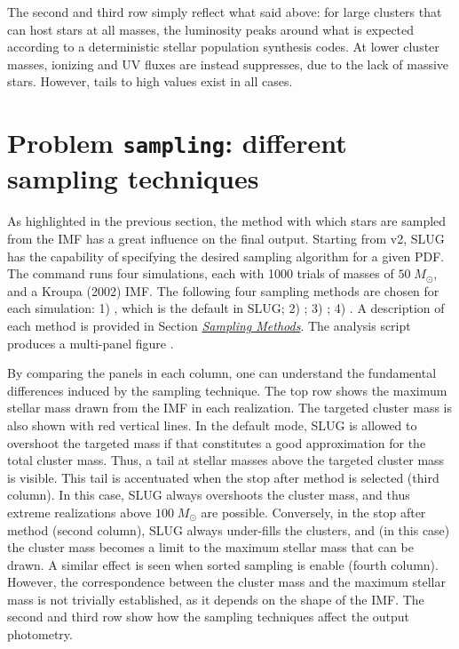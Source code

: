 \documentclass[letterpaper,10pt,english]{sphinxmanual}
\begin{document}
The second and third row simply reflect what said above: for large clusters that can host
stars at all masses, the luminosity peaks around what is expected according to a deterministic
stellar population synthesis codes. At lower cluster masses, ionizing and UV fluxes
are instead suppresses, due to the lack of massive stars. However, tails to high values exist
in all cases.


\section{Problem \texttt{sampling}: different sampling techniques}
\label{tests:problem-sampling-different-sampling-techniques}
As highlighted in the previous section, the method with which stars are sampled from the
IMF has a great influence on the final output. Starting from v2, SLUG has the capability of
specifying the desired sampling algorithm for a given PDF.
The command   runs four  simulations, each with 1000 trials
of masses of \(50\;M_\odot\), and a Kroupa (2002) IMF.
The following four sampling methods are chosen for each simulation: 1) ,
which is the default in SLUG; 2) ; 3) ; 4) .
A description of each method is provided in Section {\hyperref[pdfs:sampling-metod-label]{\emph{Sampling Methods}}}.
The analysis script  produces a multi-panel
figure .

By comparing the panels in each column, one can understand the fundamental differences
induced by the sampling technique. The top row shows the maximum stellar mass drawn from the
IMF in each realization. The targeted cluster mass is also shown with red vertical lines.
In the default mode, SLUG is allowed to overshoot the targeted mass if that constitutes
a good approximation for the total cluster mass. Thus, a tail at stellar masses above the
targeted cluster mass is visible. This tail is accentuated when the stop after method
is selected (third column). In this case, SLUG always overshoots the cluster mass, and thus
extreme realizations above \(100\;M_\odot\)  are possible. Conversely, in the
stop after method (second column), SLUG always under-fills the clusters, and (in this case)
the cluster mass becomes a limit to the maximum stellar mass that can be drawn. A similar effect
is seen when sorted sampling is enable (fourth column). However, the correspondence between the
cluster mass and the maximum stellar mass is not trivially established, as it depends on the
shape of the IMF. The second and third row show how the sampling techniques affect the output
photometry.
\end{document}
